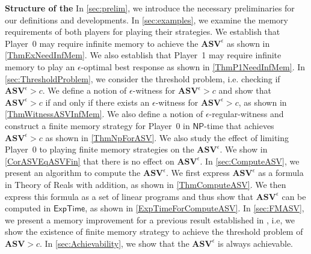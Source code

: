 \textbf{Structure of the \document} In \cref{sec:prelim}, we introduce the necessary preliminaries for our definitions and developments. 
In \cref{sec:examples}, we examine the memory requirements of both players for playing their strategies. We establish that Player~0 may require infinite memory to achieve the $\mathbf{ASV}^{\epsilon}$ as shown in \cref{ThmExNeedInfMem}. We also establish that Player~1 may require infinite memory to play an $\epsilon$-optimal best response as shown in \cref{ThmP1NeedInfMem}. 
In \cref{sec:ThresholdProblem}, we consider the threshold problem, i.e. checking if $\mathbf{ASV}^{\epsilon} > c$. We define a notion of $\epsilon$-witness for $\mathbf{ASV}^{\epsilon} > c$ and show that $\mathbf{ASV}^{\epsilon} > c$ if and only if there exists an $\epsilon$-witness for $\mathbf{ASV}^{\epsilon} > c$, as shown in \cref{ThmWitnessASVInfMem}. We also define a notion of $\epsilon$-regular-witness and construct a finite memory strategy for Player~0 in $\mathsf{NP}$-time that achieves $\mathbf{ASV}^{\epsilon} > c$ as shown in \cref{ThmNpForASV}. We also study the effect of limiting Player~0 to playing finite memory strategies on the $\mathbf{ASV}^{\epsilon}$. We show in \cref{CorASVEqASVFin} that there is no effect on $\mathbf{ASV}^{\epsilon}$.
In \cref{sec:ComputeASV}, we present an algorithm to compute the $\mathbf{ASV}^{\epsilon}$. We first express $\mathbf{ASV}^{\epsilon}$ as a formula in Theory of Reals with addition, as shown in \cref{ThmComputeASV}. We then express this formula as a set of linear programs and thus show that $\mathbf{ASV}^{\epsilon}$ can be computed in $\mathsf{ExpTime}$, as shown in \cref{ExpTimeForComputeASV}.
In \cref{sec:FMASV}, we present a memory improvement for a previous result established in \cite{FGR20}, i.e, we show the existence of finite memory strategy to achieve the threshold problem of $\mathbf{ASV} > c$. 
In \cref{sec:Achievability}, we show that the $\mathbf{ASV}^{\epsilon}$ is always achievable.